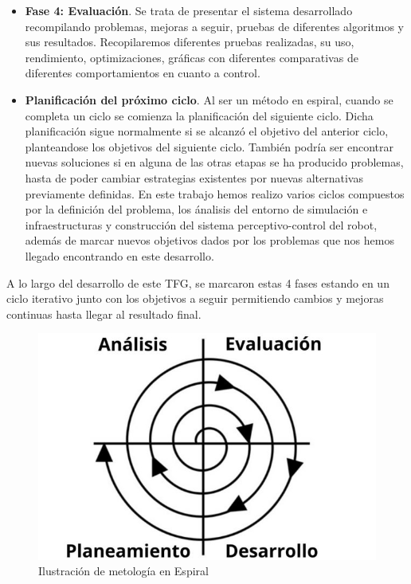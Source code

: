 \begin{enumerate}
\begin{itemize}
      \item \textbf{Fase 4: Evaluación}. Se trata de presentar el sistema desarrollado recompilando problemas, mejoras a seguir, pruebas de diferentes algoritmos y sus resultados. Recopilaremos
      diferentes pruebas realizadas, su uso, rendimiento, optimizaciones, gráficas con diferentes comparativas de diferentes comportamientos en cuanto a control.  \newline

      \item \textbf{Planificación del próximo ciclo}. Al ser un método en espiral, cuando se completa un ciclo se comienza la planificación del siguiente ciclo. Dicha planificación 
      sigue normalmente si se alcanzó el objetivo del anterior ciclo, planteandose los objetivos del siguiente ciclo. También podría ser encontrar nuevas soluciones si en alguna de las 
      otras etapas se ha producido problemas, hasta de poder cambiar estrategias existentes por nuevas alternativas previamente definidas. En este trabajo hemos realizo varios ciclos compuestos
      por la definición del problema, los ánalisis del entorno de simulación e infraestructuras y construcción del sistema perceptivo-control del robot, además de marcar nuevos 
      objetivos dados por los problemas que nos hemos llegado encontrando en este desarrollo. 

    \end{itemize}
  
    A lo largo del desarrollo de este TFG, se marcaron estas 4 fases estando en un ciclo iterativo junto con los objetivos a seguir permitiendo cambios y mejoras continuas hasta llegar al resultado final.

    \begin{figure} [H]
        \begin{center}
          \includegraphics[scale=0.5]{figs/objetivos/espiral.jpg}
        \end{center}
        \caption{Ilustración de metología en Espiral }
        \label{fig:Espiral}
      \end{figure}
  

\end{enumerate}
